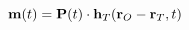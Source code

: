 \vspace{-0.1cm}
\begin{equation}
    \mathbf{m}(t) = \mathbf{P}(t) \cdot \mathbf{h}_T(\mathbf{r}_O - \mathbf{r}_T, t)
    \label{eq:uxo-m}
    \vspace{-0.05cm}
\end{equation}

